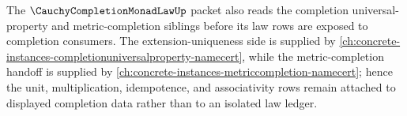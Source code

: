 The $\CauchyCompletionMonadLawUp$ packet also reads the completion universal-property and metric-completion siblings before its law rows are exposed to completion consumers. The extension-uniqueness side is supplied by \autoref{ch:concrete-instances-completionuniversalproperty-namecert}, while the metric-completion handoff is supplied by \autoref{ch:concrete-instances-metriccompletion-namecert}; hence the unit, multiplication, idempotence, and associativity rows remain attached to displayed completion data rather than to an isolated law ledger.

